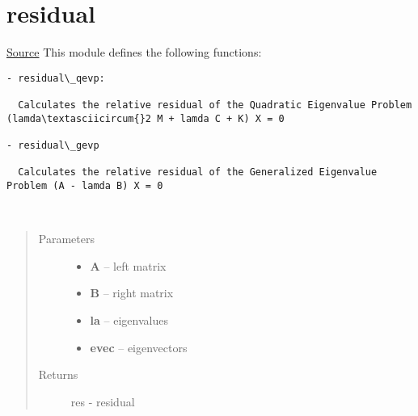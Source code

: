 \documentclass[letterpaper,10pt,english]{sphinxmanual}
\begin{document}
\section{residual}
\label{index:residual}
\href{https://bitbucket.org/akadar/brakesqueal0.1/src/master/brake/analyze/residual.py?at=master}{Source}
\label{index:module-brake.analyze.residual}
This module defines the following functions:

\begin{Verbatim}[commandchars=\\\{\}]
- residual\_qevp:

  Calculates the relative residual of the Quadratic Eigenvalue Problem (lamda\textasciicircum{}2 M + lamda C + K) X = 0

- residual\_gevp

  Calculates the relative residual of the Generalized Eigenvalue Problem (A - lamda B) X = 0
\end{Verbatim}

\begin{fulllineitems}
\label{index:brake.analyze.residual.residual_gevp}~\begin{quote}\begin{description}
\item[{Parameters}] \leavevmode\begin{itemize}
\item {} 
\textbf{A} -- left matrix

\item {} 
\textbf{B} -- right matrix

\item {} 
\textbf{la} -- eigenvalues

\item {} 
\textbf{evec} -- eigenvectors

\end{itemize}

\item[{Returns}] \leavevmode
res - residual

\end{description}\end{quote}

\end{fulllineitems}

\end{document}
